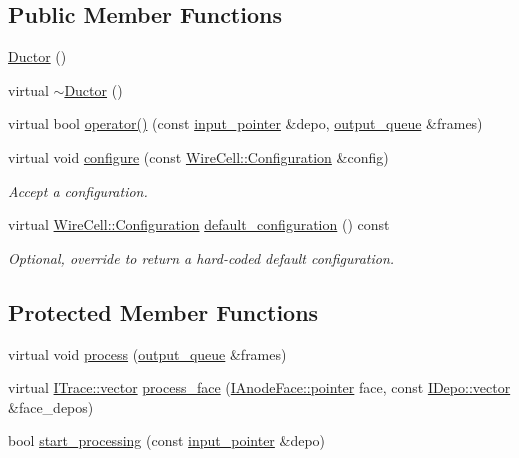 \subsection*{Public Member Functions}
\begin{DoxyCompactItemize}
\item 
\hyperlink{class_wire_cell_1_1_gen_1_1_ductor_aae745226fc466f6cab4b02e95c3338fb}{Ductor} ()
\item 
virtual \hyperlink{class_wire_cell_1_1_gen_1_1_ductor_a331c4314dba8472ab8c49dbc9112ff4b}{$\sim$\+Ductor} ()
\item 
virtual bool \hyperlink{class_wire_cell_1_1_gen_1_1_ductor_a1a103a685f920781c7d312f168b52841}{operator()} (const \hyperlink{class_wire_cell_1_1_i_queuedout_node_acf5f716a764553f3c7055a9cf67e906e}{input\+\_\+pointer} \&depo, \hyperlink{class_wire_cell_1_1_i_queuedout_node_a39018e4e3dd886befac9636ac791a685}{output\+\_\+queue} \&frames)
\item 
virtual void \hyperlink{class_wire_cell_1_1_gen_1_1_ductor_a2e5f7a0246fe8918d7b241a8be8e1917}{configure} (const \hyperlink{namespace_wire_cell_a9f705541fc1d46c608b3d32c182333ee}{Wire\+Cell\+::\+Configuration} \&config)
\begin{DoxyCompactList}\small\item\em Accept a configuration. \end{DoxyCompactList}\item 
virtual \hyperlink{namespace_wire_cell_a9f705541fc1d46c608b3d32c182333ee}{Wire\+Cell\+::\+Configuration} \hyperlink{class_wire_cell_1_1_gen_1_1_ductor_ab9486eb33932f6f7c0ff321675829178}{default\+\_\+configuration} () const
\begin{DoxyCompactList}\small\item\em Optional, override to return a hard-\/coded default configuration. \end{DoxyCompactList}\end{DoxyCompactItemize}
\subsection*{Protected Member Functions}
\begin{DoxyCompactItemize}
\item 
virtual void \hyperlink{class_wire_cell_1_1_gen_1_1_ductor_a1454baebba2e385dea9cd098236dd515}{process} (\hyperlink{class_wire_cell_1_1_i_queuedout_node_a39018e4e3dd886befac9636ac791a685}{output\+\_\+queue} \&frames)
\item 
virtual \hyperlink{class_wire_cell_1_1_i_data_ae1a9f863380499bb43f39fabb6276660}{I\+Trace\+::vector} \hyperlink{class_wire_cell_1_1_gen_1_1_ductor_afec4558613941dc3bb752a3811aadd3d}{process\+\_\+face} (\hyperlink{class_wire_cell_1_1_interface_a09c548fb8266cfa39afb2e74a4615c37}{I\+Anode\+Face\+::pointer} face, const \hyperlink{class_wire_cell_1_1_i_data_ae1a9f863380499bb43f39fabb6276660}{I\+Depo\+::vector} \&face\+\_\+depos)
\item 
bool \hyperlink{class_wire_cell_1_1_gen_1_1_ductor_acf493c7246a3fb10a52edf8f9cba9e97}{start\+\_\+processing} (const \hyperlink{class_wire_cell_1_1_i_queuedout_node_acf5f716a764553f3c7055a9cf67e906e}{input\+\_\+pointer} \&depo)
\end{DoxyCompactItemize}
